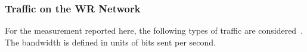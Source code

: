 
\subsubsection{Traffic on the WR Network} 
For the measurement reported here, the following types of traffic are considered~\cite{prados_testing_2016}. The bandwidth is defined in units of bits sent per second. 

